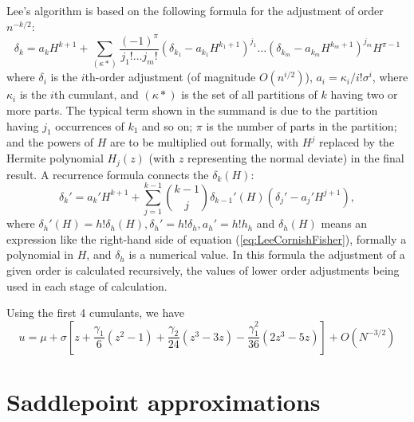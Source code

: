 Lee's algorithm is based on the following formula for the adjustment of order $n^{-k/2}$:
\begin{equation}
	\delta_k = a_k H^{k+1} + \sum_{(\kappa*)} \frac{(-1)^{\pi}}{j_1!\ldots j_m!} \left(\delta_{k_1} - a_{k_1} H^{k_1+1}\right)^{j_1} \ldots \left(\delta_{k_m} - a_{k_m} H^{k_m+1}\right)^{j_m} H^{\pi-1} \label{eq:LeeCornishFisher}
\end{equation}
where $\delta_i$ is the $i$th-order adjustment (of magnitude $O(n^{i/2})$), $a_i=\kappa_i/i! \sigma^i$, where $\kappa_i$ is the $i$th cumulant, and $(\kappa*)$ is the set of all partitions of $k$ having two or more parts. The typical term shown in the summand is due to the partition having $j_1$ occurrences of $k_1$ and so on; $\pi$ is the number of parts in the partition; and the powers of $H$ are to be multiplied out formally, with $H^j$ replaced by the Hermite polynomial $H_j(z)$ (with $z$ representing the normal deviate) in the final result.
A recurrence formula connects the $\delta_k(H)$:
\begin{equation}
	\delta_k' = a_k' H^{k+1} + \sum_{j=1}^{k-1} \binom{k-1}{j} \delta_{k-1}' (H) (\delta_j' - a_j' H^{j+1}),
\end{equation}
where $\delta_h'(H) = h! \delta_h(H), \delta_h'=h!\delta_h, a_h'=h!h_h$ and $\delta_h(H)$ means an expression like the right-hand side of equation (\ref{eq:LeeCornishFisher}), formally a polynomial in $H$, and $\delta_h$ is a numerical value. In this formula the adjustment of a given order is calculated recursively, the values of lower order adjustments being used in each stage of calculation.



Using the first 4 cumulants, we have
\begin{equation}
	u = \mu + \sigma \left[z + \frac{\gamma_1}{6}(z^2-1) + \frac{\gamma_2}{24}(z^3 - 3z) -  \frac{\gamma_1^2}{36}(2z^3-5z)\right] + O(N^{-3/2}) 
\end{equation}






\newpage
\section{Saddlepoint approximations}
%


